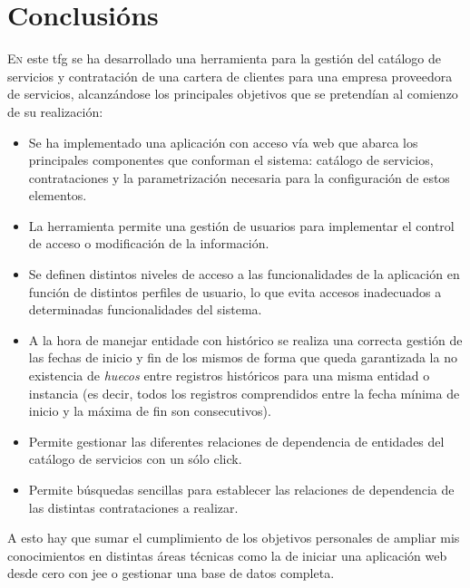 \chapter{Conclusións}
\label{chap:conclusions}

\lettrine{E}{n} este \acrshort{tfg} se ha desarrollado una herramienta para la gestión del catálogo de servicios y contratación de una cartera de clientes para una empresa proveedora de servicios, alcanzándose los principales objetivos que se pretendían al comienzo de su realización:

\begin{itemize}
\item Se ha implementado una aplicación con acceso vía web que abarca los principales componentes que conforman el sistema: catálogo de servicios, contrataciones y la parametrización necesaria para la configuración de estos elementos.

\item La herramienta permite una gestión de usuarios para implementar el control de acceso o modificación de la información.

\item Se definen distintos niveles de acceso a las funcionalidades de la aplicación en función de distintos perfiles de usuario, lo que evita accesos inadecuados a determinadas funcionalidades del sistema.

\item A la hora de manejar entidade con histórico se realiza una correcta gestión de las fechas de inicio y fin de los mismos de forma que queda garantizada la no existencia de \textit{huecos} entre registros históricos para una misma entidad o instancia (es decir, todos los registros comprendidos entre la fecha mínima de inicio y la máxima de fin son consecutivos).

\item Permite gestionar las diferentes relaciones de dependencia de entidades del catálogo de servicios con un sólo click.

\item Permite búsquedas sencillas para establecer las relaciones de dependencia de las distintas contrataciones a realizar.

\end{itemize}


A esto hay que sumar el cumplimiento de los objetivos personales de ampliar mis conocimientos en distintas áreas técnicas como la de iniciar una aplicación web desde cero con \acrshort{jee} o gestionar una base de datos completa.



